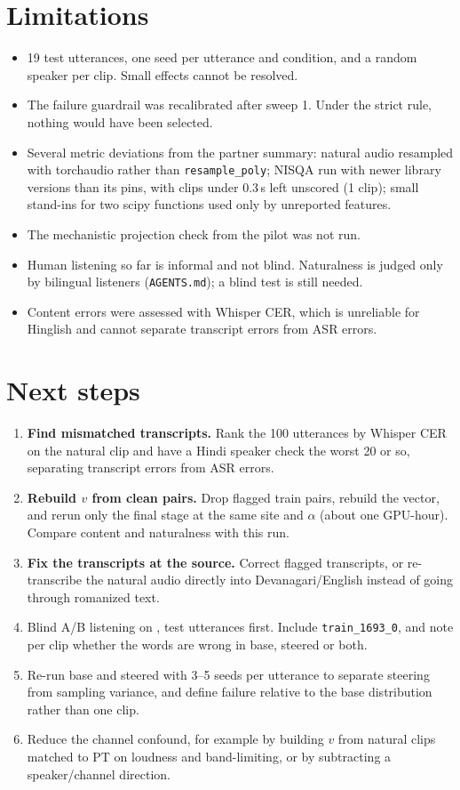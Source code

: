 \documentclass[11pt]{article}
\begin{document}
\section{Limitations}
\begin{itemize}
\item 19 test utterances, one seed per utterance and condition, and a random speaker per clip. Small effects cannot be resolved.
\item The failure guardrail was recalibrated after sweep 1. Under the strict rule, nothing would have been selected.
\item Several metric deviations from the partner summary: natural audio resampled with torchaudio rather than \texttt{resample\_poly}; NISQA run with newer library versions than its pins, with clips under 0.3\,s left unscored (1 clip); small stand-ins for two scipy functions used only by unreported features.
\item The mechanistic projection check from the pilot was not run.
\item Human listening so far is informal and not blind. Naturalness is judged only by bilingual listeners (\texttt{AGENTS.md}); a blind test is still needed.
\item Content errors were assessed with Whisper CER, which is unreliable for Hinglish and cannot separate transcript errors from ASR errors.
\end{itemize}

\section{Next steps}\label{sec:next}
\begin{enumerate}
\item \textbf{Find mismatched transcripts.} Rank the 100 utterances by Whisper CER on the natural clip and have a Hindi speaker check the worst 20 or so, separating transcript errors from ASR errors.
\item \textbf{Rebuild $v$ from clean pairs.} Drop flagged train pairs, rebuild the vector, and rerun only the final stage at the same site and $\alpha$ (about one GPU-hour). Compare content and naturalness with this run.
\item \textbf{Fix the transcripts at the source.} Correct flagged transcripts, or re-transcribe the natural audio directly into Devanagari/English instead of going through romanized text.
\item Blind A/B listening on , test utterances first. Include \texttt{train\_1693\_0}, and note per clip whether the words are wrong in base, steered or both.
\item Re-run base and steered with 3--5 seeds per utterance to separate steering from sampling variance, and define failure relative to the base distribution rather than one clip.
\item Reduce the channel confound, for example by building $v$ from natural clips matched to PT on loudness and band-limiting, or by subtracting a speaker/channel direction.
\end{enumerate}
\end{document}
